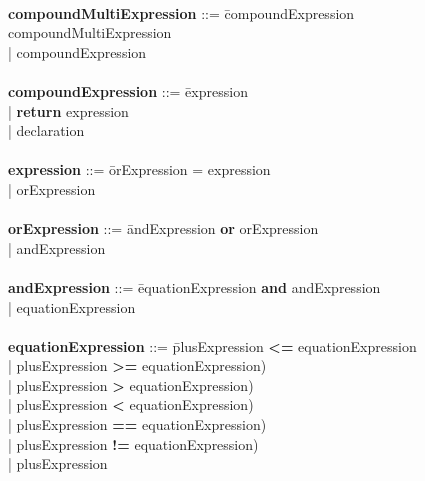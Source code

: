 \begin{tabbing}
\\ 
{\bf compoundMultiExpression}     ::= \=compoundExpression compoundMultiExpression\\
                                      \>| compoundExpression\\
\\
{\bf compoundExpression}          ::= \=expression\\
                                      \>| \textbf{return} expression\\
                                      \>| declaration\\
\\ 
{\bf expression}                  ::= \=orExpression = expression\\
                                      \>| orExpression\\
\\   
{\bf orExpression}                ::= \=andExpression \textbf{or} orExpression\\
                                      \>| andExpression\\
\\   
{\bf andExpression}               ::= \=equationExpression \textbf{and} andExpression\\
                                      \>| equationExpression\\
\\ 
{\bf equationExpression}          ::= \=plusExpression \textbf{\textless{}=} equationExpression\\
                                      \>| plusExpression \textbf{\textgreater{}=} equationExpression)\\
                                      \>| plusExpression \textbf{\textgreater{}} equationExpression)\\
                                      \>| plusExpression \textbf{\textless{}} equationExpression)\\
                                      \>| plusExpression \textbf{==} equationExpression)\\
                                      \>| plusExpression \textbf{!=} equationExpression)\\
                                      \>| plusExpression\\


\end{tabbing}
